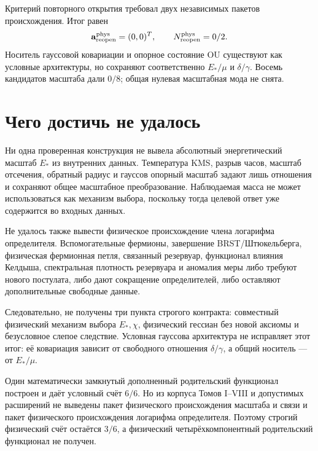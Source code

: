 Критерий повторного открытия требовал двух независимых пакетов происхождения. Итог равен
\begin{equation}
 \mathbf a_{\rm reopen}^{\rm phys}=(0,0)^T,
 \qquad N_{\rm reopen}^{\rm phys}=0/2.
 \label{eq:v9-final-reopening-status}
\end{equation}
Носитель гауссовой ковариации и опорное состояние OU существуют как условные
архитектуры, но сохраняют соответственно $E_*/\mu$ и $\delta/\gamma$.
Восемь кандидатов масштаба дали $0/8$; общая нулевая масштабная мода не снята.

\section{Чего достичь не удалось}

Ни одна проверенная конструкция не вывела абсолютный энергетический масштаб
$E_*$ из внутренних данных. Температура KMS, разрыв часов, масштаб отсечения,
обратный радиус и гауссов опорный масштаб задают лишь отношения и сохраняют
общее масштабное преобразование. Наблюдаемая масса не может использоваться
как механизм выбора, поскольку тогда целевой ответ уже содержится во входных данных.

Не удалось также вывести физическое происхождение члена логарифма определителя.
Вспомогательные фермионы, завершение BRST/Штюкельберга, физическая фермионная
петля, связанный резервуар, функционал влияния Келдыша, спектральная плотность
резервуара и аномалия меры либо требуют нового постулата, либо дают сокращение
определителей, либо
оставляют дополнительные свободные данные.

Следовательно, не получены три пункта строгого контракта: совместный
физический механизм выбора $E_*,\chi$, физический гессиан без новой аксиомы
и безусловное слепое следствие. Условная гауссова архитектура не исправляет
этот итог: её ковариация зависит от свободного отношения $\delta/\gamma$,
а общий носитель --- от $E_*/\mu$.

\begin{theorem}
Один математически замкнутый дополненный родительский функционал построен и
даёт условный счёт $6/6$. Но из корпуса Томов I--VIII и допустимых расширений
не выведены пакет физического происхождения масштаба и связи и пакет
физического происхождения логарифма определителя. Поэтому строгий физический
счёт остаётся $3/6$, а физический четырёхкомпонентный родительский функционал
не получен.
\end{theorem}

